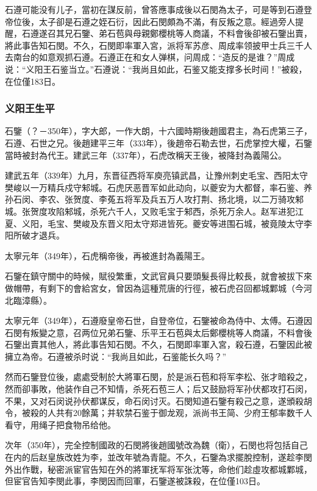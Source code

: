石遵可能没有儿子，當初在謀反前，曾答應事成後以石閔為太子，可是等到石遵登帝位後，太子卻是石遵之姪石衍，因此石閔頗為不滿，有反叛之意。經過旁人提醒，石遵遂召其兄石鑒、弟石苞與母親鄭櫻桃等人商議，不料會後卻被石鑒出賣，將此事告知石閔。不久，石閔即率軍入宮，派将军苏彦、周成率领披甲士兵三千人去南台的如意观抓石遵。石遵正在和女人弹棋，问周成：“造反的是谁？”周成说：“义阳王石鉴当立。”石遵说：“我尚且如此，石鉴又能支撑多长时间！”被殺，在位僅183日。

\subsubsection{义阳王生平}

石鑒（？－350年），字大郎，一作大朗，十六國時期後趙國君主，為石虎第三子，石遵、石世之兄。後趙建平三年（333年），後趙帝石勒去世，石虎掌控大權，石鑒當時被封為代王。建武三年（337年），石虎改稱天王後，被降封為義陽公。

建武五年（339年）九月，东晋征西将军庾亮镇武昌，让豫州刺史毛宝、西阳太守樊峻以一万精兵戍守邾城。石虎厌恶晋军如此动向，以夔安为大都督，率石鉴、养孙石闵、李农、张贺度、李菟五将军及兵五万人攻打荆、扬北境，以二万骑攻邾城。张贺度攻陷邾城，杀死六千人，又败毛宝于邾西，杀死万余人。赵军进犯江夏、义阳，毛宝、樊峻及东晋义阳太守郑进皆死。夔安等进围石城，被竟陵太守李阳所破才退兵。

太寧元年（349年），石虎稱帝後，再被進封為義陽王。

石鑒在鎮守關中的時候，賦役繁重，文武官員只要頭髮長得比較長，就會被拔下來做帽帶，有剩下的會給宮女，曾因為這種荒唐的行徑，被石虎召回都城鄴城（今河北臨漳縣）。

太寧元年（349年），石遵廢皇帝石世，自登帝位，石鑒被命為侍中、太傅。石遵因石閔有叛變之意，召两位兄弟石鑒、乐平王石苞與太后鄭櫻桃等人商議，不料會後石鑒出賣其他人，將此事告知石閔。不久，石閔即率軍入宮，殺石遵，石鑒因此被擁立為帝。石遵被杀时说：“我尚且如此，石鉴能长久吗？”

然而石鑒登位後，處處受制於大將軍石閔，於是派石苞和将军李松、张才暗殺之，然而卻事敗，他装作自己不知情，杀死石苞三人；后又鼓励将军孙伏都攻打石闵，不果，又对石闵说孙伏都谋反，命石闵讨灭。石閔知道石鑒有殺己之意，遂頒殺胡令，被殺的人共有20餘萬；并软禁石鉴于御龙观，派尚书王简、少府王郁率数千人看守，用绳子把食物吊给他。

次年（350年），完全控制國政的石閔將後趙國號改為魏（衛），石閔也将包括自己在内的后赵皇族改姓为李，並改年號為青龍。不久，石鑒為求擺脫控制，遂趁李閔外出作戰，秘密派宦官告知在外的將軍抚军将军张沈等，命他们趁虛攻都城鄴城，但宦官告知李閔此事，李閔因而回軍，石鑒遂被誅殺，在位僅103日。

